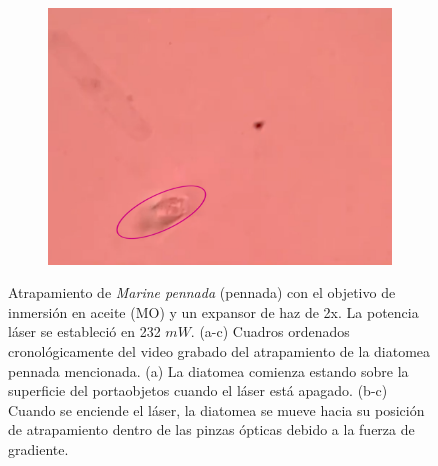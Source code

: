 \documentclass[10pt,aspectratio=1610,compress,dvipsnames]{beamer}
\begin{document}
\begin{frame}
{\begin{figure}
\begin{subfigure}[b]{0.3\textwidth}
     \end{subfigure}
     \hfill
     \begin{subfigure}[b]{0.3\textwidth}
         \centering
         \includegraphics[width=\textwidth]{Results/Fifth/pennate3water.png}
         \caption{}
         \label{fig:five over x}
     \end{subfigure}
       
     \caption{Atrapamiento de \textit{Marine pennada} (pennada) con el objetivo de inmersión en aceite (MO) y un expansor de haz de 2x. La potencia láser se estableció en 232 $mW$. (a-c) Cuadros ordenados cronológicamente del video grabado del atrapamiento de la diatomea pennada mencionada. (a) La diatomea comienza estando sobre la superficie del portaobjetos cuando el láser está apagado. (b-c) Cuando se enciende el láser, la diatomea se mueve hacia su posición de atrapamiento dentro de las pinzas ópticas debido a la fuerza de gradiente.}
\label{WIFORTH1}
     
\end{figure}

}

\end{frame}
\end{document}
